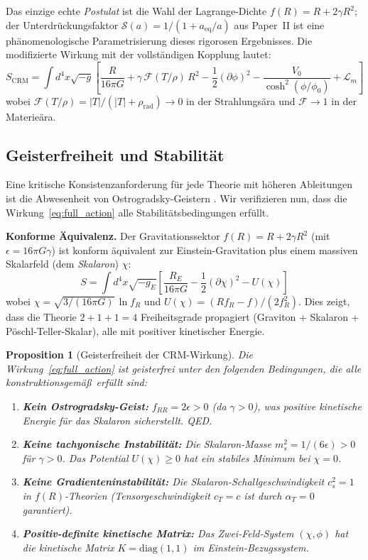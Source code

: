 \documentclass[11pt,a4paper]{article}
\newtheorem{proposition}{Proposition}
\begin{document}
Das einzige echte \textit{Postulat} ist die Wahl der Lagrange-Dichte $f(R) = R + 2\gamma R^2$; der Unterdr\"uckungsfaktor $\mathcal{S}(a) = 1/(1 + a_{\mathrm{eq}}/a)$ aus Paper~II ist eine ph\"anomenologische Parametrisierung dieses rigorosen Ergebnisses. Die modifizierte Wirkung mit der vollst\"andigen Kopplung lautet:
\begin{equation}
S_{\mathrm{CRM}} = \int d^4x \sqrt{-g} \left[\frac{R}{16\pi G} + \gamma\, \mathcal{F}(T/\rho)\, R^2 - \frac{1}{2}(\partial\phi)^2 - \frac{V_0}{\cosh^2(\phi/\phi_0)} + \mathcal{L}_m\right]
\end{equation}
wobei $\mathcal{F}(T/\rho) = |T|/(|T| + \rho_{\mathrm{rad}}) \to 0$ in der Strahlungs\"ara und $\mathcal{F} \to 1$ in der Materie\"ara.

\subsection{Geisterfreiheit und Stabilit\"at}
\label{subsec:ghost_analysis}

Eine kritische Konsistenzanforderung f\"ur jede Theorie mit h\"oheren Ableitungen ist die Abwesenheit von Ostrogradsky-Geistern \cite{Woodard2015}. Wir verifizieren nun, dass die Wirkung~\eqref{eq:full_action} alle Stabilit\"atsbedingungen erf\"ullt.

\textbf{Konforme \"Aquivalenz.} Der Gravitationssektor $f(R) = R + 2\gamma R^2$ (mit $\epsilon = 16\pi G\gamma$) ist konform \"aquivalent zur Einstein-Gravitation plus einem massiven Skalarfeld (dem \textit{Skalaron}) $\chi$:
\begin{equation}
S = \int d^4x \sqrt{-g_E} \left[\frac{R_E}{16\pi G} - \frac{1}{2}(\partial\chi)^2 - U(\chi) \right]
\end{equation}
wobei $\chi = \sqrt{3/(16\pi G)}\,\ln f_R$ und $U(\chi) = (R f_R - f)/(2 f_R^2)$. Dies zeigt, dass die Theorie $2 + 1 + 1 = 4$ Freiheitsgrade propagiert (Graviton + Skalaron + P\"oschl-Teller-Skalar), alle mit positiver kinetischer Energie.

\begin{proposition}[Geisterfreiheit der CRM-Wirkung]
Die Wirkung~\eqref{eq:full_action} ist geisterfrei unter den folgenden Bedingungen, die alle konstruktionsgem\"a\ss\ erf\"ullt sind:
\begin{enumerate}
\item \textbf{Kein Ostrogradsky-Geist:} $f_{RR} = 2\epsilon > 0$ (da $\gamma > 0$), was positive kinetische Energie f\"ur das Skalaron sicherstellt. QED.
\item \textbf{Keine tachyonische Instabilit\"at:} Die Skalaron-Masse $m_s^2 = 1/(6\epsilon) > 0$ f\"ur $\gamma > 0$. Das Potential $U(\chi) \geq 0$ hat ein stabiles Minimum bei $\chi = 0$.
\item \textbf{Keine Gradienteninstabilit\"at:} Die Skalaron-Schallgeschwindigkeit $c_s^2 = 1$ in $f(R)$-Theorien (Tensorgeschwindigkeit $c_T = c$ ist durch $\alpha_T = 0$ garantiert).
\item \textbf{Positiv-definite kinetische Matrix:} Das Zwei-Feld-System $(\chi, \phi)$ hat die kinetische Matrix $K = \mathrm{diag}(1, 1)$ im Einstein-Bezugssystem.
\end{enumerate}
\end{proposition}
\end{document}

